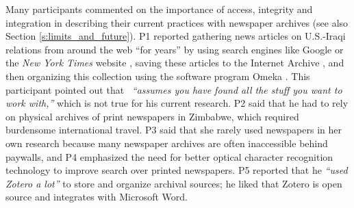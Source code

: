 Many participants commented on the importance of access, integrity and integration in describing their current practices with newspaper archives (see also Section \ref{s:limits_and_future}).
{P1} reported gathering news articles on U.S.-Iraqi relations from around the web ``for years'' by using search engines like Google or the \textit{New York Times} website \cite{nytwebsite}, saving these articles to the Internet Archive \cite{InternetArchive}, and then organizing this collection using the software program Omeka \cite{omeka}. This participant pointed out that \ours~\textit{``assumes you have found all the stuff you want to work with,''} which is not true for his current research. 
{P2} said that he had to rely on physical archives of print newspapers in Zimbabwe, which required burdensome international travel. 
{P3} said that she rarely used newspapers in her own research because many newspaper archives are often inaccessible behind paywalls, and {P4} emphasized the need for better optical character recognition technology to improve search over printed newspapers.
{P5} reported that he \textit{``used Zotero a lot''} to store and organize archival sources; he liked that Zotero is open source and integrates with Microsoft Word.
